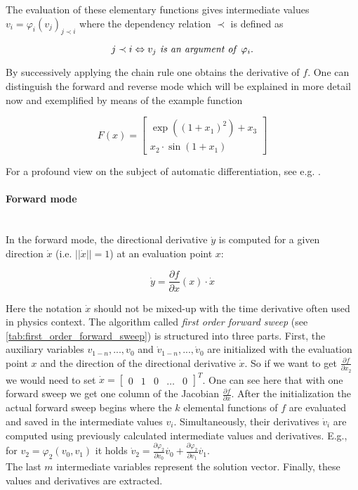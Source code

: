 \documentclass{scrartcl}[12pt, halfparskip]
\numberwithin{equation}{section}
\numberwithin{figure}{section}
\numberwithin{table}{section}
\begin{document}
The evaluation of these elementary functions gives intermediate values $v_i = \varphi_i(v_j)_{j \prec i}$ where the dependency relation $\prec$ is defined as

\begin{equation}
j \prec i \Leftrightarrow v_j \text{\textit{ is an argument of }} \varphi_i.
\end{equation}

By successively applying the chain rule one obtains the derivative of $f$.
One can distinguish the forward and reverse mode which will be explained in more detail now and exemplified by means of the example function

\begin{equation}
F(x) = 
\begin{bmatrix}
\exp((1+x_1)^2) + x_3 \\
x_2 \cdot \sin(1+x_1)
\end{bmatrix}
\label{eq:AD_example}
\end{equation}

For a profound view on the subject of automatic differentiation, see e.g. \cite{eval_derivatives_walther_griewank}.


\paragraph{Forward mode}\mbox{}\\
In the forward mode, the directional derivative $\dot{y}$ is computed for a given direction $\dot{x}$ (i.e. $|| \dot{x} || = 1$) at an evaluation point $x$:

\begin{equation}
\dot{y} = \frac{\partial f}{\partial x}(x) \cdot \dot{x}
\end{equation}

Here the notation $\dot{x}$ should not be mixed-up with the time derivative often used in physics context.
The algorithm called \textit{first order forward sweep} (see \cref{tab:first_order_forward_sweep}) is structured into three parts. First, the auxiliary variables $v_{1-n},...,v_0$ and $\dot{v}_{1-n},...,\dot{v}_0$ are initialized with the evaluation point $x$ and the direction of the directional derivative $\dot{x}$. So if we want to get $\frac{\partial f}{\partial x_2}$ we would need to set $\dot{x} = \begin{bmatrix}
0 & 1 & 0 & \dots & 0
\end{bmatrix}^T$. One can see here that with one forward sweep we get one column of the Jacobian $ \frac{\partial f}{\partial x}$. 
After the initialization the actual forward sweep begins where the $k$ elemental functions of $f$ are evaluated and saved in the intermediate values $v_i$. Simultaneously, their derivatives  $\dot{v}_i$ are computed using previously calculated intermediate values and derivatives. E.g., for $v_2 = \varphi_2(v_0, v_1)$ it holds $\dot{v}_2 = \frac{\partial \varphi_2}{\partial v_0} \dot{v_0} + \frac{\partial \varphi_2}{\partial v_1} \dot{v_1}$. \\
The last $m$ intermediate variables represent the solution vector. Finally, these values and derivatives are extracted.
\end{document}
